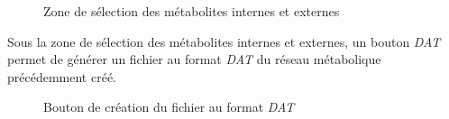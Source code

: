 \begin{figure}[!ht]
    \begin{center}
        \caption{Zone de sélection des métabolites internes et externes}
          \label{boutonMET_int_EXT}
      \end{center}   
\end{figure}

Sous la zone de sélection des métabolites internes et externes, un bouton \emph{DAT} permet de générer un fichier au format \emph{DAT} du réseau métabolique précédemment créé. \\

\begin{figure}[!ht]
    \begin{center}
        \caption{Bouton de création du fichier au format \emph{DAT}}
          \label{boutonDAT}
      \end{center}   
\end{figure}


